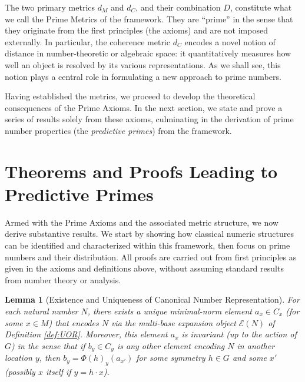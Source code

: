 \documentclass[11pt]{article}
\newtheorem{lemma}{Lemma}[section]
\begin{document}
The two primary metrics $d_M$ and $d_C$, and their combination $D$, constitute what we call the Prime Metrics of the framework. They are “prime” in the sense that they originate from the first principles (the axioms) and are not imposed externally. In particular, the coherence metric $d_C$ encodes a novel notion of distance in number-theoretic or algebraic space: it quantitatively measures how well an object is resolved by its various representations. As we shall see, this notion plays a central role in formulating a new approach to prime numbers.

Having established the metrics, we proceed to develop the theoretical consequences of the Prime Axioms. In the next section, we state and prove a series of results solely from these axioms, culminating in the derivation of prime number properties (the \emph{predictive primes}) from the framework.

\section{Theorems and Proofs Leading to Predictive Primes}
Armed with the Prime Axioms and the associated metric structure, we now derive substantive results. We start by showing how classical numeric structures can be identified and characterized within this framework, then focus on prime numbers and their distribution. All proofs are carried out from first principles as given in the axioms and definitions above, without assuming standard results from number theory or analysis.

\begin{lemma}[Existence and Uniqueness of Canonical Number Representation]\label{lem:unique-rep}
For each natural number $N$, there exists a unique minimal-norm element $a_x \in C_x$ (for some $x \in M$) that encodes $N$ via the multi-base expansion object $\mathcal{E}(N)$ of Definition \ref{def:UOR}. Moreover, this element $a_x$ is invariant (up to the action of $G$) in the sense that if $b_y \in C_y$ is any other element encoding $N$ in another location $y$, then $b_y = \Phi(h)_y(a_{x'})$ for some symmetry $h \in G$ and some $x'$ (possibly $x$ itself if $y = h\cdot x$).
\end{lemma}
\end{document}
